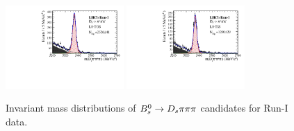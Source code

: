\begin{figure}[h]
\includegraphics[height=!,width=0.4\textwidth]{figs/MassFit/norm_Run1_pipipi_t0.pdf}
\includegraphics[height=!,width=0.4\textwidth]{figs/MassFit/norm_Run1_pipipi_t1.pdf}
\caption{Invariant mass distributions of ${{B}^0_{s}}\rightarrow{\ensuremath{{D}_{s}}}{\ensuremath{\pi}}{\ensuremath{\pi}}{\ensuremath{\pi}}$ candidates for Run-I data.}
\label{fig:massfits_norm_Run1}
\end{figure}

\clearpage

